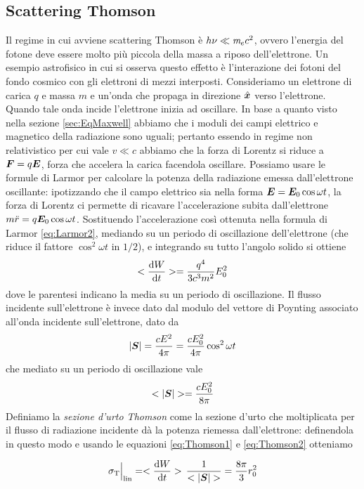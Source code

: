 \subsection{Scattering Thomson} \label{subsec:Thomson}
Il regime in cui avviene scattering Thomson è $h\nu \ll \textit{m}_{e} c^2$, ovvero l'energia del fotone deve essere molto più piccola della massa a riposo dell'elettrone. Un esempio astrofisico in cui si osserva questo effetto è l'interazione dei fotoni del fondo cosmico con gli elettroni di mezzi interposti. Consideriamo un elettrone di carica $q$ e massa $m$ e un'onda che propaga in direzione $\vers{x}$ verso l'elettrone. Quando tale onda incide l'elettrone inizia ad oscillare. In base a quanto visto nella sezione \ref{sec:EqMaxwell} abbiamo che i moduli dei campi elettrico e magnetico della radiazione sono uguali; pertanto essendo in regime non relativistico per cui vale $v\ll c$ abbiamo che la forza di Lorentz si riduce a $\V{F}=q \V{E}$, forza che accelera la carica facendola oscillare. Possiamo usare le formule di Larmor per calcolare la potenza della radiazione emessa dall'elettrone oscillante: ipotizzando che il campo elettrico sia nella forma $\V{E} = \V{E}_0 \cos \omega t$, la forza di Lorentz ci permette di ricavare l'accelerazione subita dall'elettrone $m\ddot{r} = q \V{E}_0 \cos\omega t$. Sostituendo l'accelerazione così ottenuta nella formula di Larmor \ref{eq:Larmor2}, mediando su un periodo di oscillazione dell'elettrone (che riduce il fattore $\cos^2\omega t$ in $1/2$), e integrando su tutto l'angolo solido si ottiene
\begin{equation}
< \dfrac{\mathrm{d} {W}}{\mathrm{d} {t}} >= \dfrac{q^4}{3c^3m^2}E_0^2 \label{eq:Thomson1}
\end{equation}
dove le parentesi indicano la media su un periodo di oscillazione. Il flusso incidente sull'elettrone è invece dato dal modulo del vettore di Poynting associato all'onda incidente sull'elettrone, dato da
\begin{equation}
|\V{S}| = \dfrac{c E^2}{4\pi} = \dfrac{cE_0^2}{4\pi} \cos^2\omega t
\end{equation}
che mediato su un periodo di oscillazione vale 
\begin{equation}
<|\V{S}|> = \dfrac{c E_0^2}{8\pi} \label{eq:Thomson2}
\end{equation}
Definiamo la \textit{sezione d'urto Thomson} come la sezione d'urto che moltiplicata per il flusso di radiazione incidente dà la potenza riemessa dall'elettrone: definendola in questo modo e usando le equazioni \ref{eq:Thomson1} e \ref{eq:Thomson2} otteniamo 
\begin{EQ}
\begin{equation}
\sigma_\mathrm{T}\Big|_\mathrm{lin} = < \der{W}{t} > \, \inv{<|\V{S}|>} = \dfrac{8\pi}{3} r_0^2
\end{equation}
\end{EQ}
